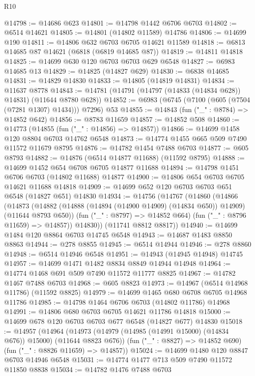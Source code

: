 \begin{lexlean}{R10}
\begin{coremodule}
@14798 := @14686 @623
@14801 := @14798 @1442 @6706 @6703
@14802 := @6514 @14621
@14805 := @14801 (@14802 @11589) @14786
@14806 := @14699 @190
@14811 := @14806 @632 @6703 @6705 @14621 @11589
@14818 := @6813 @14685 @87 @14621 (@6818 (@6819 @14685 @87))
@14819 := @14811 @14818
@14825 := @14699 @630 @120 @6703 @6703 @629 @6548
@14827 := @6983 @14685 @13
@14829 := @14825 (@14827 @629)
@14830 := @6838 @14685
@14831 := @14829 @14830
@14833 := @14805 (@14819 @14831)
@14834 := @11637 @8778
@14843 := @14781 (@14791 (@14797 (@14833 (@14834 @628)) @14831) (@11644 @8780 @628))
@14852 := @6983 (@6745 (@7100 (@605 (@7504 (@7281 @1307) @1434))) @7296) @53
@14855 := @14843 (fun ("_" : @8784) => @14852 @642)
@14856 := @8783 @11659
@14857 := @14852 @508
@14860 := @14773 (@14855 (fun ("_" : @14856) => @14857))
@14866 := @14699 @1458 @120 @8804 @6703 @14762 @6548
@14873 := @14774 @1455 @665 @509 @7490 @11572 @11679 @8795
@14876 := @14782 @1454 @7488 @6703
@14877 := @605 @8793
@14882 := @14876 (@6514 @14877 @11688) (@11592 @8795)
@14888 := @14699 @1452 @654 @6708 @6705 @14877 @11688
@14894 := @14798 @1451 @6706 @6703 (@14802 @11688) @14877
@14900 := @14806 @654 @6703 @6705 @14621 @11688 @14818
@14909 := @14699 @652 @120 @6703 @6703 @651 @6548 (@14827 @651) @14830
@14934 := @14756
    (@14767
      (@14860
        (@14866
          (@14873
            (@14882 (@14888 (@14894 (@14900 @14909) (@14834 @650)) @14909) (@11644 @8793 @650))
            (fun ("_" : @8797) => @14852 @664)
            (fun ("_" : @8796 @11659) => @14857))
          @14830))
      (@11741 @8812 @8817))
@14940 := @14699 @1484 @120 @8864 @6703 @14745 @6548
@14943 := @14687 @1483 @8850 @8863
@14944 := @278 @8855
@14945 := @6514 @14944
@14946 := @278 @8860
@14948 := @6514 @14946 @6548
@14951 := @14943 (@14945 @14948) @14745
@14957 := @14699 @1471 @1482 @8834 @8849 @14944 @14948
@14964 := @14774 @1468 @691 @509 @7490 @11572 @11777 @8825
@14967 := @14782 @1467 @7488 @6703
@14968 := @605 @8823
@14973 := @14967 (@6514 @14968 @11786) (@11592 @8825)
@14979 := @14699 @1465 @680 @6708 @6705 @14968 @11786
@14985 := @14798 @1464 @6706 @6703 (@14802 @11786) @14968
@14991 := @14806 @680 @6703 @6705 @14621 @11786 @14818
@15000 := @14699 @678 @120 @6703 @6703 @677 @6548 (@14827 @677) @14830
@15018 := @14957
    (@14964
      (@14973 (@14979 (@14985 (@14991 @15000) (@14834 @676)) @15000) (@11644 @8823 @676))
      (fun ("_" : @8827) => @14852 @690)
      (fun ("_" : @8826 @11659) => @14857))
@15024 := @14699 @1480 @120 @8847 @6703 @14946 @6548
@15031 := @14774 @1477 @713 @509 @7490 @11572 @11850 @8838
@15034 := @14782 @1476 @7488 @6703

\end{coremodule}
\end{lexlean}
